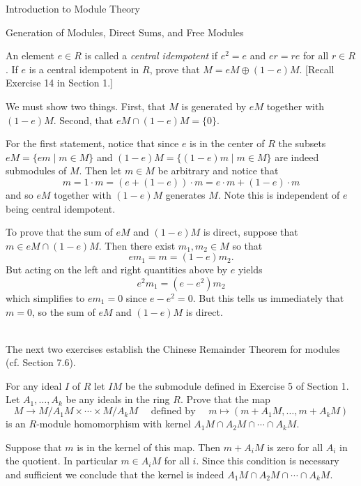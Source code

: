 \begin{chapter}{Introduction to Module Theory}
\begin{section}{Generation of Modules, Direct Sums, and Free Modules}
\begin{solution}
\end{solution}\oneperpage



\begin{problem}\label{ex:10.3.15}
An element $e\in R$ is called a \emph{central idempotent} if $e^2=e$ and $er = re$ for all $r\in R$. If $e$ is a central idempotent in $R$, prove that $M= eM\oplus (1-e)M$. [Recall Exercise 14 in Section 1.]
\end{problem}
\begin{solution}We must show two things. First, that $M$ is generated by $eM$ together with $(1-e)M$. Second, that $eM\cap (1-e)M = \{0\}$. 

For the first statement, notice that since $e$ is in the center of $R$ the subsets $eM = \{em\mid m\in M\}$ and $(1-e)M = \{(1-e)m\mid m\in M\}$ are indeed submodules of $M$. Then let $m\in M$ be arbitrary and notice that \[
m = 1\cdot m = (e+(1-e))\cdot m = e\cdot m + (1-e)\cdot m
\]
and so $eM$ together with $(1-e)M$ generates $M$. Note this is independent of $e$ being central idempotent. 

To prove that the sum of $eM$ and $(1-e)M$ is direct, suppose that $m\in eM\cap (1-e)M$. Then there exist $m_1,m_2\in M$ so that \[
em_1 = m = (1-e)m_2.
\]
But acting on the left and right quantities above by $e$ yields \[
e^2m_1 = (e-e^2)m_2
\]
which simplifies to $em_1 = 0$ since $e-e^2=0$. But this tells us immediately that $m = 0$, so the sum of $eM$ and $(1-e)M$ is direct. 
\end{solution}\oneperpage


\quad\\The next two exercises establish the Chinese Remainder Theorem for modules (cf. Section 7.6).

\begin{problem}\label{ex:10.3.16}
For any ideal $I$ of $R$ let $IM$ be the submodule defined in Exercise 5 of Section 1. Let $A_1,\ldots,A_k$ be any ideals in the ring $R$. Prove that the map \[
M\to M/A_1M\times\cdots  \times M/A_k M\quad\text{ defined by }\quad m\mapsto (m+A_1M,\ldots,m+A_kM)
\]
is an $R$-module homomorphism with kernel $A_1M\cap A_2M\cap \cdots \cap A_kM$.
\end{problem}
\begin{solution}Suppose that $m$ is in the kernel of this map. Then $m+A_iM$ is zero for all $A_i$ in the quotient. In particular $m\in A_iM$ for all $i$. Since this condition is necessary and sufficient we conclude that the kernel is indeed $A_1M\cap A_2M\cap\cdots \cap A_kM$. 


\end{solution}
\end{section}
\end{chapter}
